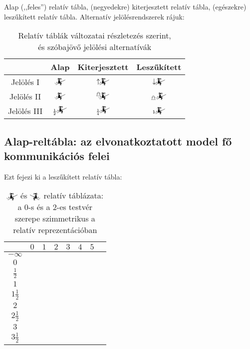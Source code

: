 \documentclass{article}
\newcommand{\blk}{\cellcolor{darkgray}}
\newcommand{\red}{\cellcolor{red!33}}
\newcommand{\grn}{\cellcolor{green!33}}
\newcommand{\nothing}{\text{\raisebox{0.4em}{\rotatebox{180}{$\curvearrowleft$}}}}%
\newcommand{\just}[1]{\boxed{#1}}%
\newcommand{\incl}{\mathbf{incl}}
\newcommand{\excl}{\mathbf{excl}}
\newcommand{\currymainfun}[1]{\mathwitch_{#1}}
\newcommand{\currymainfunA}{\mathwitch}
\newcommand{\currymainfunB}{\reversemathwitch}
\begin{document}
	Alap (,,feles'') relatív tábla, (negyedekre) kiterjesztett relatív tábla, (egészekre) leszűkített relatív tábla. Alternatív jelölésrendszerek rájuk:
	\begin{table}[H]
		\caption*{Relatív táblák változatai részletezés szerint,\\és szóbajövő jelölési alternatívák}
		\centering
		\begin{tabular}{c|ccc}
			             &  Alap                             &  Kiterjesztett                     &  Leszűkített\\\hline\hline
			Jelölés I    &  $\currymainfun{}$                &  $\uparrow\!\!\!\currymainfun{}$       &  $\downarrow\!\!\!\currymainfun{}$\\\hline
			Jelölés II   &  $\currymainfun{}$                &  ${}^{\mathghost}\!\!\!\currymainfun{}$  &  ${}_{\mathghost}\!\currymainfun{}$\\\hline
			Jelölés III  &  ${}_{\frac12}\!\!\currymainfun{}$  &  ${}_{\frac14}\!\!\currymainfun{}$   &  ${}_1\!\!\currymainfun{}$
		\end{tabular}
	\end{table}

	\subsection{Alap-reltábla: az elvonatkoztatott model fő kommunikációs felei}

	Ezt fejezi ki a leszűkített relatív tábla:

	\begin{table}[H]
		\caption*{$\currymainfunA$ és $\currymainfunB$ relatív táblázata: a 0-s és a 2-es testvér szerepe szimmetrikus a relatív reprezentációban}
		\centering
		\begin{tabular}{c||c|c|c|c|c|c|c|}
				&	$0$		&	$1$		&	$2$		&	$3$		&	$4$		&	$5$		\\\hline\hline
		$-\infty$	&	\nothing	&	\nothing	&	\nothing	&	\nothing	&	\nothing	&	\nothing	\\\hline
			$0$	&	\nothing	&	\nothing	&	\nothing	&	\nothing	&	\nothing	&	\grn\just\incl	\\\hline
		$\frac12$	&	\red\just\excl	&	\nothing	&	\nothing	&	\nothing	&	\nothing	&	\grn\just\incl	\\\hline
			$1$	&	\red\just\excl	&	\nothing	&	\nothing	&	\nothing	&	\grn\just\incl	&	\blk		\\\hline
		$1\frac12$	&	\blk		&	\red\just\excl	&	\nothing	&	\nothing	&	\grn\just\incl	&	\blk		\\\hline
			$2$	&	\blk		&	\red\just\excl	&	\nothing	&	\grn\just\incl	&	\blk		&	\blk		\\\hline
		$2\frac12$	&	\blk		&	\blk		&	\red\just\excl	&	\grn\just\incl	&	\blk		&	\blk		\\\hline
			$3$	&	\blk		&	\blk		&	\blk		&	\blk		&	\blk		&	\blk		\\\hline
		$3\frac12$	&	\blk		&	\blk		&	\blk		&	\blk		&	\blk		&	\blk		\\\hline
		\end{tabular}
	\end{table}
\end{document}
